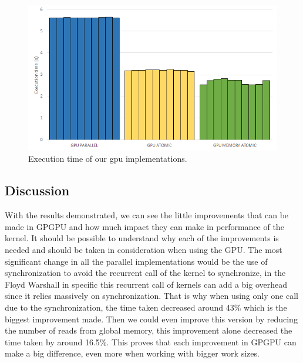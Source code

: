 \documentclass[conference]{IEEEtran}
\begin{document}
\begin{figure}[htbp]
	\centerline{\includegraphics[width=\linewidth]{figures/graph_gpus.png}}
	\caption{Execution time of our gpu implementations.}
	\label{fig1}
\end{figure}

\subsection{Discussion}

With the results demonstrated, we can see the little improvements that can be made in GPGPU and how much impact they can make in performance of the kernel. It should be possible to understand why each of the improvements is needed and should be taken in consideration when using the GPU. The most significant change in all the parallel implementations would be the use of synchronization to avoid the recurrent call of the kernel to synchronize, in the Floyd Warshall in specific this recurrent call of kernels can add a big overhead since it relies massively on synchronization. That is why when using only one call due to the synchronization, the time taken decreased around 43\% which is the biggest improvement made. Then we could even improve this version by reducing the number of reads from global memory, this improvement alone decreased the time taken by around 16.5\%. This proves that each improvement in GPGPU can make a big difference, even more when working with bigger work sizes.

\end{document}
